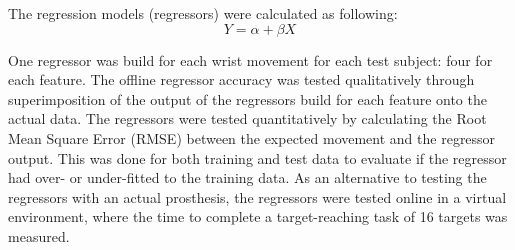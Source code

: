 \documentclass[landscape,a0paper,fontscale=0.375]{baposter} %
\begin{document}
\begin{poster}
{%
%
%
%
The regression models (regressors) were calculated as following:
\vspace{-0.1cm}
\begin{equation} \label{eq:simpleLinearRegression}
Y = \alpha + \beta X
\end{equation} \vspace{-0.7cm}


One regressor was build for each wrist movement for each test subject: four for each feature. The offline regressor accuracy was tested qualitatively through superimposition of the output of the regressors build for each feature onto the actual data. The regressors were tested quantitatively by calculating the Root Mean Square Error (RMSE) between the expected movement and the regressor output. This was done for both training and test data to evaluate if the regressor had over- or under-fitted to the training data. 
As an alternative to testing the regressors with an actual prosthesis, the regressors were tested online in a virtual environment, where the time to complete a target-reaching task of 16 targets was measured. 

}
\end{poster}
\end{document}
